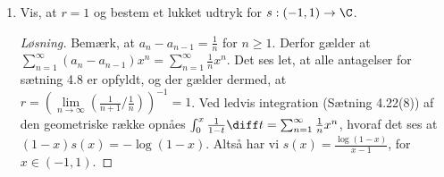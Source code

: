 \begin{opg}
\begin{enumerate}
\begin{proof}[Løsning]
    \end{proof}
    \fi 
    \item Vis, at $ r=1 $ og bestem et lukket udtryk for $ s:(-1,1)\to \C $.
    \ifanswers
    \begin{proof}[Løsning]
    	Bemærk, at $ a_n-a_{n-1}=\frac{1}{n} $ for $ n\geq 1 $. Derfor gælder at $ \sum_{n=1}^{\infty}(a_n-a_{n-1})x^n=\sum_{n=1}^{\infty}\frac{1}{n}x^n $. Det ses let, at alle antagelser for sætning 4.8 er opfyldt, og der gælder dermed, at $ r=\left(\lim\limits_{n\to\infty}\left(\frac{1}{n+1}\Big/\frac{1}{n}\right)\right)^{-1}=1 $. Ved ledvis integration (Sætning 4.22(8)) af den geometriske række opnåes $ \int_{0}^{x} \frac{1}{1-t}\diff t=\sum_{n=1}^{\infty}\frac{1}{n}x^n $, hvoraf det ses at $ (1-x)s(x)=-\log(1-x) $. Altså har vi $ s(x)=\frac{\log(1-x)}{x-1} $, for $ x\in(-1,1) $.
    \end{proof}
    \fi
\end{enumerate}
\end{opg}

